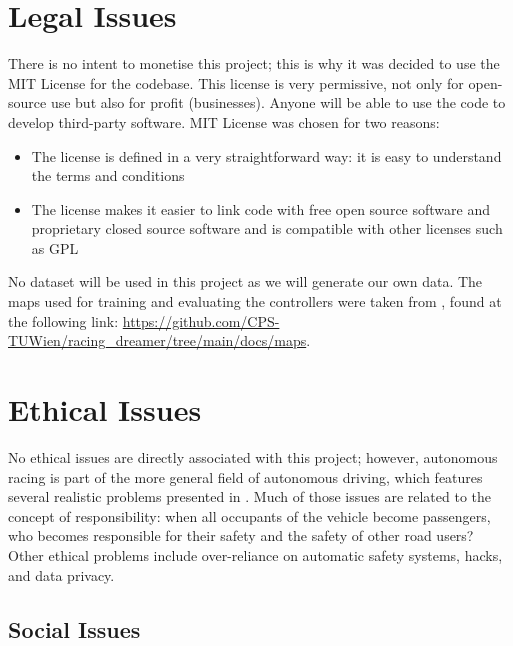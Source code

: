 \section{Legal Issues}
\label{legiss}
There is no intent to monetise this project; this is why it was decided to use the MIT License for the codebase. This license is very permissive, not only for open-source use but also for profit (businesses). Anyone will be able to use the code to develop third-party software. MIT License was chosen for two reasons:
\begin{itemize}
	\item The license is defined in a very straightforward way: it is easy to understand the terms and conditions
	\item The license makes it easier to link code with free open source software and proprietary closed source software and is compatible with other licenses such as GPL
\end{itemize}
No dataset will be used in this project as we will generate our own data. The maps used for training and evaluating the controllers were taken from \cite{brunnbauer2022latent}, found at the following link: \url{https://github.com/CPS-TUWien/racing_dreamer/tree/main/docs/maps}.

\section{Ethical Issues}
\label{ethiss}
No ethical issues are directly associated with this project; however, autonomous racing is part of the more general field of autonomous driving, which features several realistic problems presented in \cite{ethical}. Much of those issues are related to the concept of responsibility: when all occupants of the vehicle become passengers, who becomes responsible for their safety and the safety of other road users? Other ethical problems include over-reliance on automatic safety systems, hacks, and data privacy. 
\subsection{Social Issues}
\label{sociss}

